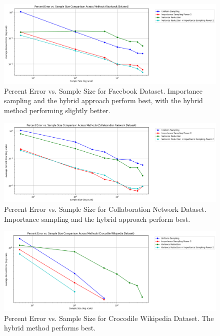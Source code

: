 \documentclass[11pt, margin=1in]{article}
\begin{document}
\begin{figure}[H]
\centering
\includegraphics[width=0.9\linewidth]{plots/comparisons/fb/limited_method_percent_error_vs_sample_size_comparison.png}
\caption{Percent Error vs. Sample Size for Facebook Dataset. Importance sampling and the hybrid approach perform best, with the hybrid method performing slightly better.}
\label{fig:fb_sample_size}
\end{figure}

\begin{figure}[H]
\centering
\includegraphics[width=0.9\linewidth]{plots/comparisons/GrQc/limited_method_percent_error_vs_sample_size_comparison.png}
\caption{Percent Error vs. Sample Size for Collaboration Network Dataset. Importance sampling and the hybrid approach perform best.}
\label{fig:grqc_sample_size}
\end{figure}

\begin{figure}[H]
\centering
\includegraphics[width=0.9\linewidth]{plots/comparisons/croc/limited_method_percent_error_vs_sample_size_comparison.png}
\caption{Percent Error vs. Sample Size for Crocodile Wikipedia Dataset. The hybrid method performs best.}
\label{fig:croc_sample_size}
\end{figure}
\end{document}
